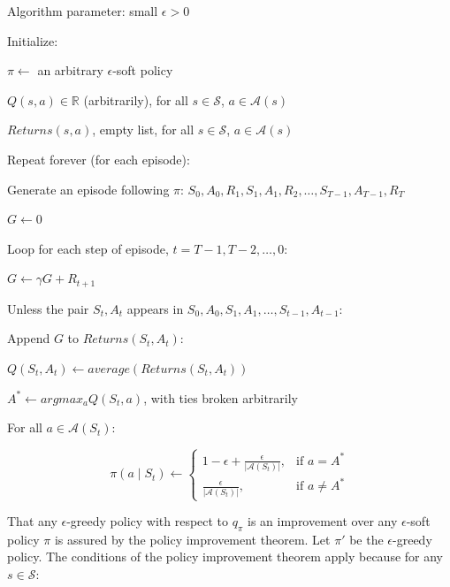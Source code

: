 \documentclass{article}
\begin{document}
Algorithm parameter: small \(\epsilon > 0\)

Initialize:

\hspace{.5cm} \(\pi \leftarrow\) an arbitrary \(\epsilon\)-soft policy

\hspace{.5cm} \(Q(s, a) \in \mathbb{R}\) (arbitrarily), for all \(s \in \mathcal{S}\), \(a \in \mathcal{A}(s)\)

\hspace{.5cm} \(Returns(s, a)\), empty list, for all \(s \in \mathcal{S}\), \(a \in \mathcal{A}(s)\)

Repeat forever (for each episode):

\hspace{.5cm} Generate an episode following \(\pi\): \(S_0, A_0, R_1, S_1, A_1, R_2, \dots, S_{T - 1}, A_{T - 1}, R_{T}\)

\hspace{.5cm} \(G \leftarrow 0\)

\hspace{.5cm} Loop for each step of episode, \(t = T - 1, T - 2, \dots, 0\):

\hspace{1cm} \(G \leftarrow \gamma G + R_{t + 1}\)

\hspace{1cm} Unless the pair \(S_t, A_t\) appears in \(S_0, A_0, S_1, A_1, \dots, S_{t - 1}, A_{t - 1}\):

\hspace{1.5cm} Append \(G\) to \(Returns(S_t, A_t)\):

\hspace{1.5cm} \(Q(S_t, A_t) \leftarrow average(Returns(S_t, A_t))\)

\hspace{1.5cm} \(A^* \leftarrow argmax_{a} Q(S_t, a)\), with ties broken arbitrarily

\hspace{1.5cm} For all \(a \in \mathcal{A}(S_t)\):

\[
\pi(a \mid S_t) \leftarrow
\begin{cases}
1 - \epsilon + \frac{\epsilon}{\vert \mathcal{A}(S_t) \vert}, & \text{if } a = A^*\\
\frac{\epsilon}{\vert \mathcal{A}(S_t) \vert}, & \text{if } a \neq A^*
\end{cases}
\]

That any \(\epsilon\)-greedy policy with respect to \(q_{\pi}\) is an improvement over any \(\epsilon\)-soft policy \(\pi\) is assured by the policy improvement theorem.
Let \(\pi'\) be the \(\epsilon\)-greedy policy. The conditions of the policy improvement theorem apply because for any \(s \in \mathcal{S}\):
\end{document}
